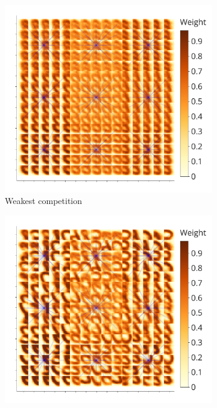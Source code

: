 \documentclass[a4paper,10pt]{article}
\begin{document}
\begin{figure}
\centering
\begin{subfigure}{0.45\textwidth} 
    \includegraphics[width=\textwidth,keepaspectratio=true]{competition_on_XY_worst.pdf}
    \caption{Weakest competition}
    \label{fig:worst_competition_distribution}
\end{subfigure}
\begin{subfigure}{0.45\textwidth}
    \includegraphics[width=\textwidth,keepaspectratio=true]{competition_on_XY_medium_bad.pdf}

\end{subfigure}
\end{figure}
\end{document}
